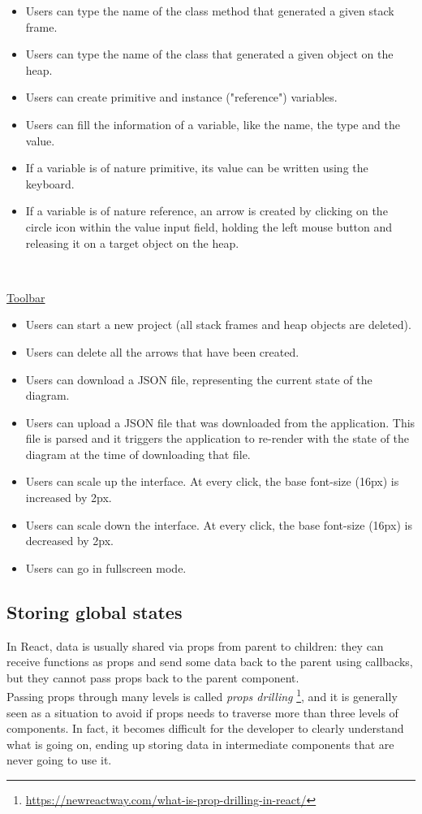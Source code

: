 \documentclass[]{usiinfbachelorproject}
\begin{document}
\begin{itemize}
	\item Users can type the name of the class method that generated a given stack frame.
	\item Users can type the name of the class that generated a given object on the heap.
	\item Users can create primitive and instance ("reference") variables.
	\item Users can fill the information of a variable, like the name, the type and the value.
	\item If a variable is of nature primitive, its value can be written using the keyboard.
	\item If a variable is of nature reference, an arrow is created by clicking on the circle icon within the value input field, holding the left mouse button and releasing it on a target object on the heap.
\end{itemize}\

\vspace{\fill}
\pagebreak

\ul{Toolbar}

\begin{itemize}
	\item Users can start a new project (all stack frames and heap objects are deleted).
	\item Users can delete all the arrows that have been created.
	\item Users can download a JSON file, representing the current state of the diagram.
	\item Users can upload a JSON file that was downloaded from the application. This file is parsed and it triggers the application to re-render with the state of the diagram at the time of downloading that file.
	\item Users can scale up the interface. At every click, the base font-size (16px) is increased by 2px.
	\item Users can scale down the interface. At every click, the base font-size (16px) is decreased by 2px.
	\item Users can go in fullscreen mode.
\end{itemize}

\subsection{Storing global states} \label{storing states}

In React, data is usually shared via props from parent to children: they can receive functions as props and send some data back to the parent using callbacks, but they cannot pass props back to the parent component.\\ Passing props through many levels is called \emph{props drilling} \footnote{\url{https://newreactway.com/what-is-prop-drilling-in-react/}}, and it is generally seen as a situation to avoid if props needs to traverse more than three levels of components. In fact, it becomes difficult for the developer to clearly understand what is going on, ending up storing data in intermediate components that are never going to use it.\\
\end{document}
